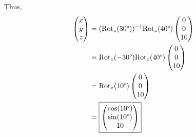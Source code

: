 \documentclass[12pt]{article}
\begin{document}
Thus,
\begin{align*}
	\begin{pmatrix} x \\ y \\ z \end{pmatrix}
	&=
	(\text{Rot}_z(30 \degree))^{-1}
	\text{Rot}_z(40 \degree)
	\begin{pmatrix} 0 \\ 0 \\ 10 \end{pmatrix} \\
	&=
	\text{Rot}_z(-30 \degree)
	\text{Rot}_z(40 \degree)
	\begin{pmatrix} 0 \\ 0 \\ 10 \end{pmatrix} \\
	&=
	\text{Rot}_z(10 \degree)
	\begin{pmatrix} 0 \\ 0 \\ 10 \end{pmatrix} \\
	&=
	\boxed{
		\begin{pmatrix}
			\cos(10 \degree) \\
			\sin(10 \degree) \\
			10
		\end{pmatrix}
	}
\end{align*}
\end{document}
